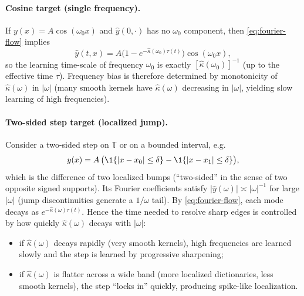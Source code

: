 \paragraph{Cosine target (single frequency).}
If $y(x)=A\cos(\omega_0 x)$ and $\hat y(0,\cdot)$ has no $\omega_0$ component, then \eqref{eq:fourier-flow} implies
\[
\hat y(t,x)=A\big(1-e^{-\widehat{\kappa}(\omega_0)\tau(t)}\big)\cos(\omega_0 x),
\]
so the learning time-scale of frequency $\omega_0$ is exactly $[\widehat{\kappa}(\omega_0)]^{-1}$ (up to the effective time $\tau$).
Frequency bias is therefore determined by monotonicity of $\widehat{\kappa}(\omega)$ in $|\omega|$ (many smooth kernels have $\widehat{\kappa}(\omega)$ decreasing in $|\omega|$, yielding slow learning of high frequencies).

\paragraph{Two-sided step target (localized jump).}
Consider a two-sided step on $\mathbb{T}$ or on a bounded interval, e.g.
\[
y(x)=A\,\big(\1\{|x-x_0|\le \delta\}-\1\{|x-x_1|\le \delta\}\big),
\]
which is the difference of two localized bumps (``two-sided'' in the sense of two opposite signed supports).
Its Fourier coefficients satisfy $|\widehat y(\omega)|\asymp |\omega|^{-1}$ for large $|\omega|$ (jump discontinuities generate a $1/\omega$ tail).
By \eqref{eq:fourier-flow}, each mode decays as $e^{-\widehat{\kappa}(\omega)\tau(t)}$.
Hence the time needed to resolve sharp edges is controlled by how quickly $\widehat{\kappa}(\omega)$ decays with $|\omega|$:
\begin{itemize}
\item if $\widehat{\kappa}(\omega)$ decays rapidly (very smooth kernels), high frequencies are learned slowly and the step is learned by progressive sharpening;
\item if $\widehat{\kappa}(\omega)$ is flatter across a wide band (more localized dictionaries, less smooth kernels), the step ``locks in'' quickly, producing spike-like localization.
\end{itemize}

